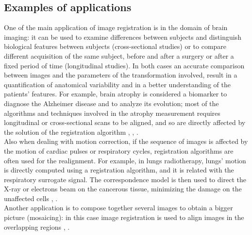 \subsection{Examples of applications}
One of the main application of image registration is in the domain of brain imaging: it can be used to examine differences between subjects and distinguish biological features between subjects (cross-sectional studies) or to compare different acquisition of the same subject, before and after a surgery or after a fixed period of time (longitudinal studies). In both cases an accurate comparison between images and the parameters of the transformation involved, result in a quantification of anatomical variability and in a better understanding of the patients' features. 
%
For example, brain atrophy is considered a biomarker to diagnose the Alzheimer disease and to analyze its evolution; most of the algorithms and techniques involved in the atrophy measurement requires longitudinal or cross-sectional scans to be aligned, and so are directly affected by the solution of the registration algorithm \cite{fox1997brain}, \cite{gauthier2012prevention}, \cite{prados2015measuring}. \\
Also when dealing with motion correction, if the sequence of images is affected by the motion of cardiac pulses or respiratory cycles, registration algorithms are often used for the realignment. 
For example, in lungs radiotherapy, lungs' motion is directly computed using a registration algorithm, and it is related with the respiratory surrogate signal. The correspondence model is then used to direct the X-ray or electrons beam on the cancerous tissue, minimizing the damage on the unaffected cells \cite{mcclelland}, \cite{mcclelland2011inter}.\\
Another application is to compose together several images to obtain a bigger picture (mosaicing): in this case image registration is used to align images in the overlapping regions \cite{vercauteren2006robust}, \cite{szeliski1994image}.

